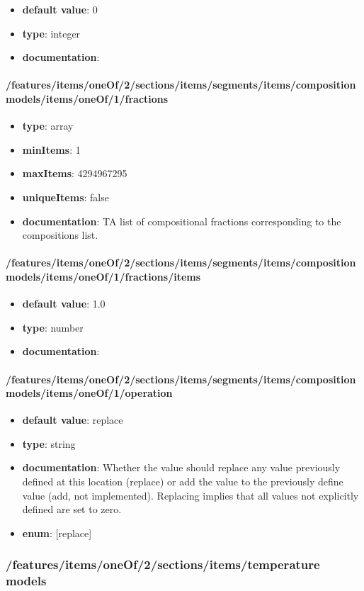 \begin{itemize}\item {\bf default value}: 0
\item {\bf type}: integer
\item {\bf documentation}: 
\end{itemize}\paragraph{/features/items/oneOf/2/sections/items/segments/items/composition models/items/oneOf/1/fractions}
\begin{itemize}\item {\bf type}: array
\item {\bf minItems}: 1
\item {\bf maxItems}: 4294967295
\item {\bf uniqueItems}: false
\item {\bf documentation}: TA list of compositional fractions corresponding to the compositions list.
\end{itemize}\paragraph{/features/items/oneOf/2/sections/items/segments/items/composition models/items/oneOf/1/fractions/items}
\begin{itemize}\item {\bf default value}: 1.0
\item {\bf type}: number
\item {\bf documentation}: 
\end{itemize}\paragraph{/features/items/oneOf/2/sections/items/segments/items/composition models/items/oneOf/1/operation}
\begin{itemize}\item {\bf default value}: replace
\item {\bf type}: string
\item {\bf documentation}: Whether the value should replace any value previously defined at this location (replace) or add the value to the previously define value (add, not implemented). Replacing implies that all values not explicitly defined are set to zero.
\item {\bf enum}: [replace]\end{itemize}\subsubsection{/features/items/oneOf/2/sections/items/temperature models}
